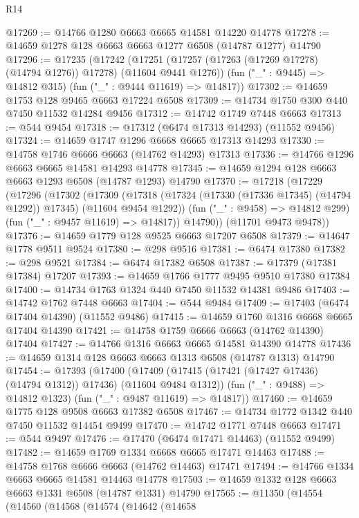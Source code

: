 \begin{lexlean}{R14}
\begin{coremodule}
{{{{{{{{{{{{{{{{{{{{{{{{{{{{{{{{{{{{{{{{{{{{{{{{{{{{{{{{{{{{{{{{{{{{{{{{{{{{{{{{{{@17269 := @14766 @1280 @6663 @6665 @14581 @14220 @14778
@17278 := @14659 @1278 @128 @6663 @6663 @1277 @6508 (@14787 @1277) @14790
@17296 := @17235
    (@17242
      (@17251 (@17257 (@17263 (@17269 @17278) (@14794 @1276)) @17278) (@11604 @9441 @1276))
      (fun ("_" : @9445) => @14812 @315)
      (fun ("_" : @9444 @11619) => @14817))
@17302 := @14659 @1753 @128 @9465 @6663 @17224 @6508
@17309 := @14734 @1750 @300 @440 @7450 @11532 @14284 @9456
@17312 := @14742 @1749 @7448 @6663
@17313 := @544 @9454
@17318 := @17312 (@6474 @17313 @14293) (@11552 @9456)
@17324 := @14659 @1747 @1296 @6668 @6665 @17313 @14293
@17330 := @14758 @1746 @6666 @6663 (@14762 @14293) @17313
@17336 := @14766 @1296 @6663 @6665 @14581 @14293 @14778
@17345 := @14659 @1294 @128 @6663 @6663 @1293 @6508 (@14787 @1293) @14790
@17370 := @17218
    (@17229
      (@17296
        (@17302
          (@17309
            (@17318 (@17324 (@17330 (@17336 @17345) (@14794 @1292)) @17345) (@11604 @9454 @1292))
            (fun ("_" : @9458) => @14812 @299)
            (fun ("_" : @9457 @11619) => @14817))
          @14790))
      (@11701 @9473 @9478))
@17376 := @14659 @1779 @128 @9525 @6663 @17207 @6508
@17379 := @14647 @1778 @9511 @9524
@17380 := @298 @9516
@17381 := @6474 @17380
@17382 := @298 @9521
@17384 := @6474 @17382 @6508
@17387 := @17379 (@17381 @17384) @17207
@17393 := @14659 @1766 @1777 @9495 @9510 @17380 @17384
@17400 := @14734 @1763 @1324 @440 @7450 @11532 @14381 @9486
@17403 := @14742 @1762 @7448 @6663
@17404 := @544 @9484
@17409 := @17403 (@6474 @17404 @14390) (@11552 @9486)
@17415 := @14659 @1760 @1316 @6668 @6665 @17404 @14390
@17421 := @14758 @1759 @6666 @6663 (@14762 @14390) @17404
@17427 := @14766 @1316 @6663 @6665 @14581 @14390 @14778
@17436 := @14659 @1314 @128 @6663 @6663 @1313 @6508 (@14787 @1313) @14790
@17454 := @17393
    (@17400
      (@17409 (@17415 (@17421 (@17427 @17436) (@14794 @1312)) @17436) (@11604 @9484 @1312))
      (fun ("_" : @9488) => @14812 @1323)
      (fun ("_" : @9487 @11619) => @14817))
@17460 := @14659 @1775 @128 @9508 @6663 @17382 @6508
@17467 := @14734 @1772 @1342 @440 @7450 @11532 @14454 @9499
@17470 := @14742 @1771 @7448 @6663
@17471 := @544 @9497
@17476 := @17470 (@6474 @17471 @14463) (@11552 @9499)
@17482 := @14659 @1769 @1334 @6668 @6665 @17471 @14463
@17488 := @14758 @1768 @6666 @6663 (@14762 @14463) @17471
@17494 := @14766 @1334 @6663 @6665 @14581 @14463 @14778
@17503 := @14659 @1332 @128 @6663 @6663 @1331 @6508 (@14787 @1331) @14790
@17565 := @11350
    (@14554
      (@14560
        (@14568
          (@14574
            (@14642
              (@14658
}}}}}}}}}}}}}}}}}}}}}}}}}}}}}}}}}}}}}}}}}}}}}}}}}}}}}}}}}}}}}}}}}}}}}}}}}}}}}}}}}}
\end{coremodule}
\end{lexlean}
